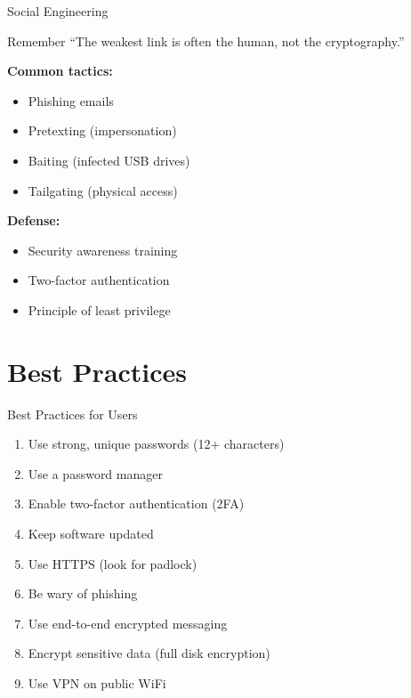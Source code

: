 \documentclass{beamer}
\begin{document}
\begin{frame}{Social Engineering}
\begin{alertblock}{Remember}
``The weakest link is often the human, not the cryptography.''
\end{alertblock}

\vspace{0.3cm}
\textbf{Common tactics:}
\begin{itemize}
    \item Phishing emails
    \item Pretexting (impersonation)
    \item Baiting (infected USB drives)
    \item Tailgating (physical access)
\end{itemize}

\vspace{0.3cm}
\textbf{Defense:}
\begin{itemize}
    \item Security awareness training
    \item Two-factor authentication
    \item Principle of least privilege
\end{itemize}

\end{frame}

\section{Best Practices}

\begin{frame}{Best Practices for Users}
\begin{enumerate}
    \item Use strong, unique passwords (12+ characters)
    \item Use a password manager
    \item Enable two-factor authentication (2FA)
    \item Keep software updated
    \item Use HTTPS (look for padlock)
    \item Be wary of phishing
    \item Use end-to-end encrypted messaging
    \item Encrypt sensitive data (full disk encryption)
    \item Use VPN on public WiFi
\end{enumerate}
\end{frame}
\end{document}
